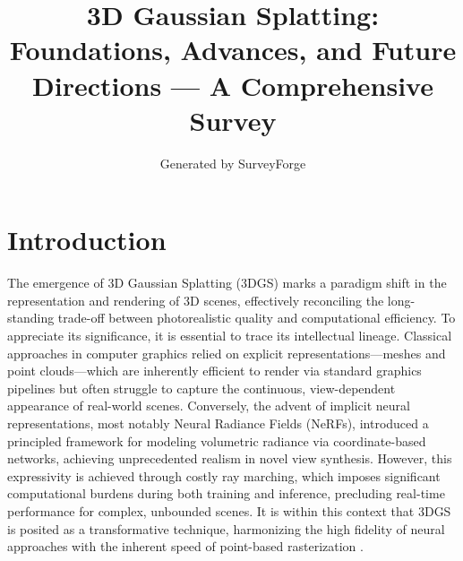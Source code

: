 \documentclass[11pt,a4paper]{article}
\title{3D Gaussian Splatting: Foundations, Advances, and Future Directions --- A Comprehensive Survey}
\author{Generated by SurveyForge}
\date{}
\begin{document}
\maketitle
\tableofcontents
\newpage



\section{Introduction}


The emergence of 3D Gaussian Splatting (3DGS) marks a paradigm shift in the representation and rendering of 3D scenes, effectively reconciling the long-standing trade-off between photorealistic quality and computational efficiency. To appreciate its significance, it is essential to trace its intellectual lineage. Classical approaches in computer graphics relied on explicit representations---meshes and point clouds---which are inherently efficient to render via standard graphics pipelines but often struggle to capture the continuous, view-dependent appearance of real-world scenes. Conversely, the advent of implicit neural representations, most notably Neural Radiance Fields (NeRFs), introduced a principled framework for modeling volumetric radiance via coordinate-based networks, achieving unprecedented realism in novel view synthesis. However, this expressivity is achieved through costly ray marching, which imposes significant computational burdens during both training and inference, precluding real-time performance for complex, unbounded scenes. It is within this context that 3DGS is posited as a transformative technique, harmonizing the high fidelity of neural approaches with the inherent speed of point-based rasterization \cite{arxiv:2401.03890v2}.
\end{document}
